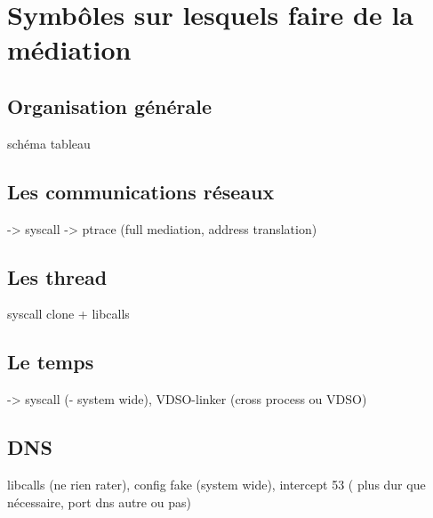 \section{Symbôles sur lesquels faire de la médiation}
\subsection{Organisation générale}
schéma tableau

\subsection{Les communications réseaux}
 -> syscall -> ptrace (full mediation, address translation)

\subsection{Les thread}
 syscall clone + libcalls

\subsection{Le temps}
 -> syscall (- system wide), VDSO-linker (cross process ou VDSO)

\subsection{DNS}
libcalls (ne rien rater), config fake (system wide), intercept 53 ( plus dur que nécessaire, port dns autre ou pas)
